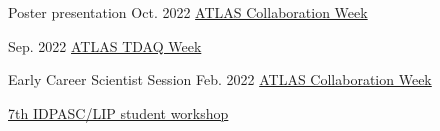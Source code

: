 \begin{cventries}
    {Poster presentation}
    {Oct. 2022}
    {\href{https://indico.cern.ch/event/1187086/\#37-the-atlas-jet-trigger-in-ru}{ATLAS Collaboration Week}}
    {}\vspace*{2mm}

    {}
    {Sep. 2022}
    {\href{https://indico.cern.ch/event/1172448/contributions/4924082/}{ATLAS TDAQ Week}}
    {}\vspace*{2mm}

    {Early Career Scientist Session}
    {Feb. 2022}
    {\href{https://indico.cern.ch/event/1108354/\#167-readiness-of-the-jet-trigg}{ATLAS Collaboration Week}}{}



    {\href{https://indico.lip.pt/event/1245/}{7th IDPASC/LIP student workshop}}{}
    
    




\end{cventries}